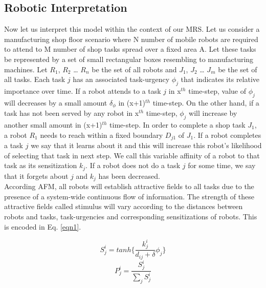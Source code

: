 \documentclass{llncs}
\begin{document}
\subsection{Robotic Interpretation}
Now let us interpret this model within the context of our MRS. Let us consider a manufacturing shop floor scenario where N number of mobile robots are required to attend to M number of shop tasks spread over a fixed area A.
Let these tasks be represented by a set of small rectangular boxes resembling to manufacturing machines.
Let $R_1$, $R_2$ … $R_n$ be the set of all robots and $J_1$, $J_2$ … $J_m$ be the set of all tasks.
Each task $j$ has an associated task-urgency $\phi_j$ that indicates its relative importance over time.
If a robot attends to a task $j$ in x$^{th}$ time-step, value of $\phi_j$ will decreases by a small amount $\delta_\phi$ in (x+1)$^{th}$ time-step.
On the other hand, if a task has not been served by any robot in x$^{th}$ time-step, $\phi_j$ will increase by another small amount in (x+1)$^{th}$ time-step.
In order to complete a shop task $J_1$, a robot $R_1$ needs to reach within a fixed boundary $D_{j1}$ of $J_1$.
If a robot completes a task $j$ we say that it learns about it and this will increase this robot's likelihood of selecting that task in next step.
We call this variable affinity of a robot to that task as its sensitization $k_j$.
If a robot does not do a task $j$ for some time, we say that it forgets about $j$ and $k_j$ has been decreased.\\
According AFM, all robots will establish attractive fields to all tasks due to the presence of a system-wide continuous flow of information.
The strength of these attractive fields called stimulus will vary according to the distances between robots and tasks, task-urgencies and corresponding sensitizations of robots. This is encoded in Eq. \ref{eqn1}.
\begin{small}
\begin{multicols}{2}
\begin{equation}
S_{j}^{i} = tanh\{\frac{k_{j}^{i}}{d_{ij}+\delta } \phi _{j}\}
\label{eqn1}
\end{equation}
\vspace*{0.25cm}
\begin{equation}
P_{j}^{i} = \frac{S_{j}^{i}}{\sum_{j}^{}S_{j}^{i}}
\label{eqn2}
\end{equation}
\end{multicols}
\end{small}
\end{document}
